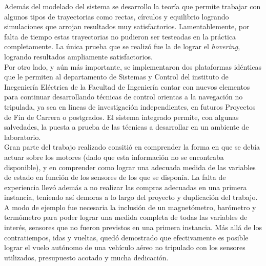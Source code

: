 \documentclass[main]{subfiles}
\begin{document}
Adem\'as del modelado del sistema se desarrollo la teor\'ia que permite trabajar con algunos tipos de trayectorias como rectas, c\'irculos y equilibrio logrando simulaciones que arrojan resultados muy satisfactorios. Lamentablemente, por falta de tiempo estas trayectorias no pudieron ser testeadas en la pr\'actica completamente. La \'unica prueba que se realiz\'o fue la de lograr el \emph{hovering}, logrando resultados ampliamente satisfactorios.\\

Por otro lado, y aún más importante, se implementaron dos plataformas id\'enticas que le permiten al departamento de Sistemas y Control del instituto de Inegenier\'ia El\'ectrica de la Facultad de Ingenier\'ia contar con nuevos elementos para continuar desarrollando t\'ecnicas de control orientas a la navegaci\'on no tripulada, ya sea en lineas de investigaci\'on independientes, en futuros Proyectos de Fin de Carrera o postgrados. El sistema integrado permite, con algunas salvedades, la puesta a prueba de las t\'ecnicas a desarrollar en un ambiente de laboratorio.\\

Gran parte del trabajo realizado consiti\'o en comprender la forma en que se deb\'ia actuar sobre los motores (dado que esta informaci\'on no se encontraba disponible), y en comprender como lograr una adecuada medida de las variables de estado en funci\'on de los sensores de los que se dispon\'ia. La falta de experiencia llev\'o adem\'as a no realizar las compras adecuadas en una primera instancia, teniendo as\'i demoras a lo largo del proyecto y duplicaci\'on del trabajo. A modo de ejemplo fue necesaria la inclusión de un magnetómetro, barómetro y termómetro para poder lograr una medida completa de todas las variables de interés, sensores que no fueron previstos en una primera instancia. Más allá de los contratiempos, idas y vueltas, quedó demostrado que efectivamente es posible lograr el vuelo autónomo de una vehículo aéreo no tripulado con los sensores utilizados, presupuesto acotado y mucha dedicación.\\

\end{document}
